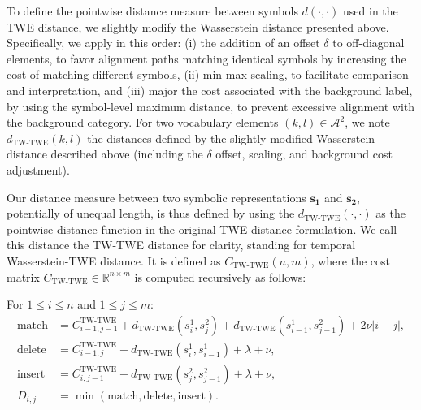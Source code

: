 \begin{chapterabstract}
    
        To define the pointwise distance measure between symbols $d(\cdot,\cdot)$ used in the TWE distance, we slightly modify the Wasserstein distance presented above. Specifically, we apply in this order: (i) the addition of an offset $\delta$ to off-diagonal elements, to favor alignment paths matching identical symbols by increasing the cost of matching different symbols, (ii) min-max scaling, to facilitate comparison and interpretation,  and (iii) major the cost associated with the background label, by using the symbol-level maximum distance, to prevent excessive alignment with the background category. For two vocabulary elements $(k,l) \in \mathcal{A}^2$, we note $d_{\text{TW-TWE}}(k,l)$ the distances defined by the slightly modified Wasserstein distance described above (including the $\delta$ offset, scaling, and background cost adjustment).

        Our distance measure between two symbolic representations $\mathbf{s_1}$ and  $\mathbf{s_2}$, potentially of unequal length, is thus defined by using the $d_{\text{TW-TWE}}(\cdot,\cdot)$ as the pointwise distance function in the original TWE distance formulation. We call this distance the TW-TWE distance for clarity, standing for temporal Wasserstein-TWE distance. It is defined as $C_{\text{TW-TWE}}(n,m)$, where the cost matrix $C_{\text{TW-TWE}} \in \mathbb{R}^{n \times m}$ is computed recursively as follows:

        For $1 \leq i \leq n$ and $1 \leq j \leq m$:
        \begin{align*}
        \text{match} &= C^{\text{TW-TWE}}_{i-1,j-1} + d_{\text{TW-TWE}}(s^1_i,s^2_j) + d_{\text{TW-TWE}}(s^1_{i-1}, s^2_{j-1}) + 2\nu |i-j|, \\
        \text{delete} &= C^{\text{TW-TWE}}_{i-1,j} + d_{\text{TW-TWE}}(s^1_i, s^1_{i-1}) + \lambda + \nu, \\
        \text{insert} &= C^{\text{TW-TWE}}_{i,j-1} + d_{\text{TW-TWE}}(s^2_j, s^2_{j-1}) + \lambda + \nu, \\
        D_{i,j} &= \min(\text{match}, \text{delete}, \text{insert}).
        \end{align*}
        

\end{chapterabstract}
